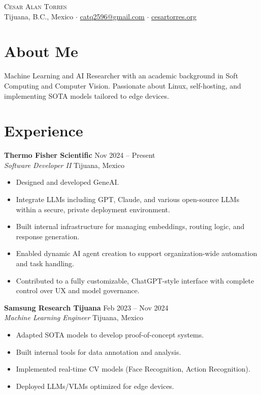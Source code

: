 \documentclass[letterpaper,11pt]{article}
\newcommand{\resumeItem}[1]{\item{\small{#1}}}
\newcommand{\resumeSubheading}[4]{
  \vspace{1pt}\textbf{#1} \hfill #2\\
  {\emph{#3}} \hfill {\small #4}\\
}
\begin{document}
\begin{center}
    {\LARGE \scshape Cesar Alan Torres} \\ 
    \vspace{1pt}
    Tijuana, B.C., Mexico $\cdot$ \href{mailto:catq2596@gmail.com}{catq2596@gmail.com} $\cdot$ \href{https://cesartorres.org}{cesartorres.org} \\
\end{center}

\section*{About Me}
Machine Learning and AI Researcher with an academic background in Soft Computing and Computer Vision. Passionate about Linux, self-hosting, and implementing SOTA models tailored to edge devices.

\section*{Experience}
\resumeSubheading{Thermo Fisher Scientific}{Nov 2024 -- Present}{Software Developer II}{Tijuana, Mexico}
\begin{itemize}[leftmargin=0.15in]
  \resumeItem{Designed and developed GeneAI.}
  \resumeItem{Integrate LLMs including GPT, Claude, and various open-source LLMs within a secure, private deployment environment.}
  \resumeItem{Built internal infrastructure for managing embeddings, routing logic, and response generation.}
  \resumeItem{Enabled dynamic AI agent creation to support organization-wide automation and task handling.}
  \resumeItem{Contributed to a fully customizable, ChatGPT-style interface with complete control over UX and model governance.}
\end{itemize}

\resumeSubheading{Samsung Research Tijuana}{Feb 2023 -- Nov 2024}{Machine Learning Engineer}{Tijuana, Mexico}
\begin{itemize}[leftmargin=0.15in]
  \resumeItem{Adapted SOTA models to develop proof-of-concept systems.}
  \resumeItem{Built internal tools for data annotation and analysis.}
  \resumeItem{Implemented real-time CV models (Face Recognition, Action Recognition).}
  \resumeItem{Deployed LLMs/VLMs optimized for edge devices.}
\end{itemize}
\end{document}
